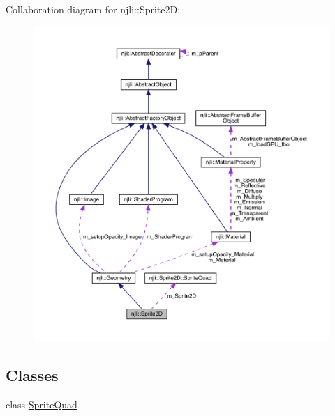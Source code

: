 Collaboration diagram for njli\+:\+:Sprite2D\+:\nopagebreak
\begin{figure}[H]
\begin{center}
\leavevmode
\includegraphics[width=350pt]{classnjli_1_1_sprite2_d__coll__graph}
\end{center}
\end{figure}
\subsection*{Classes}
\begin{DoxyCompactItemize}
\item 
class \mbox{\hyperlink{classnjli_1_1_sprite2_d_1_1_sprite_quad}{Sprite\+Quad}}
\end{DoxyCompactItemize}
